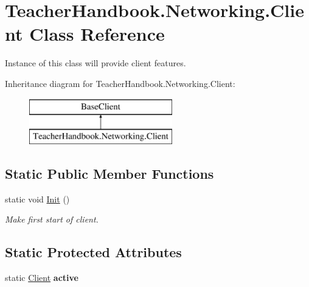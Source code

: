 \hypertarget{class_teacher_handbook_1_1_networking_1_1_client}{}\section{Teacher\+Handbook.\+Networking.\+Client Class Reference}
\label{class_teacher_handbook_1_1_networking_1_1_client}


Instance of this class will provide client features.  


Inheritance diagram for Teacher\+Handbook.\+Networking.\+Client\+:\begin{figure}[H]
\begin{center}
\leavevmode
\includegraphics[height=2.000000cm]{d8/d91/class_teacher_handbook_1_1_networking_1_1_client}
\end{center}
\end{figure}
\subsection*{Static Public Member Functions}
\begin{DoxyCompactItemize}
\item 
static void \mbox{\hyperlink{class_teacher_handbook_1_1_networking_1_1_client_ad37de86191b6dae582e338c57182bace}{Init}} ()
\begin{DoxyCompactList}\small\item\em Make first start of client. \end{DoxyCompactList}\end{DoxyCompactItemize}
\subsection*{Static Protected Attributes}
\begin{DoxyCompactItemize}
\item 
\mbox{\label{class_teacher_handbook_1_1_networking_1_1_client_a2df2ba8468bd5796d0b9cbe7cb27caa8}} 
static \mbox{\hyperlink{class_teacher_handbook_1_1_networking_1_1_client}{Client}} {\bfseries active}
\end{DoxyCompactItemize}
